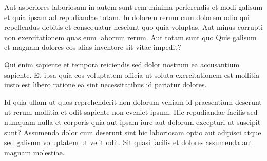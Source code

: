 Aut asperiores laboriosam in autem sunt rem minima perferendis et modi galisum et quia ipsam ad repudiandae totam. In dolorem rerum cum dolorem odio qui repellendus debitis et consequatur nesciunt quo quia voluptas. Aut minus corrupti non exercitationem quas eum laborum rerum. Aut totam sunt quo Quis galisum et magnam dolores eos alias inventore sit vitae impedit?

Qui enim sapiente et tempora reiciendis sed dolor nostrum ea accusantium sapiente. Et ipsa quia eos voluptatem officia ut soluta exercitationem est mollitia iusto est libero ratione ea sint necessitatibus id pariatur dolores.

Id quia ullam ut quos reprehenderit non dolorum veniam id praesentium deserunt ut rerum mollitia et odit sapiente non eveniet ipsum. Hic repudiandae facilis sed numquam nulla et corporis quia aut ipsam iure aut dolorum excepturi ut suscipit sunt? Assumenda dolor cum deserunt sint hic laboriosam optio aut adipisci atque sed galisum voluptatem ut velit odit. Sit quasi facilis et dolores assumenda aut magnam molestiae.